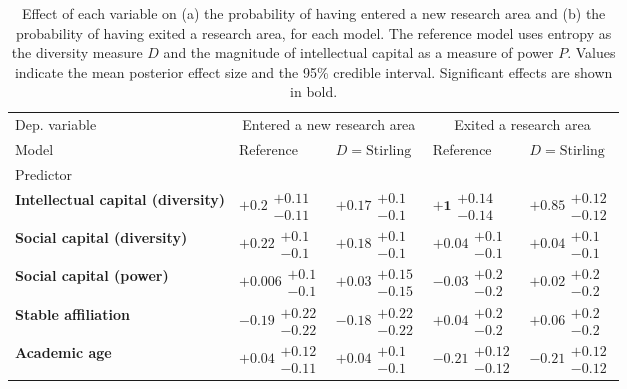 \begin{table}[H]
\caption{Effect of each variable on (a) the probability of having entered a new research area and (b) the probability of having exited a research area, for each model. The reference model uses entropy as the diversity measure $D$ and the magnitude of intellectual capital as a measure of power $P$. Values indicate the mean posterior effect size and the 95\% credible interval. Significant effects are shown in bold.}
\label{table:summary_entered_exited}
\renewcommand{\arraystretch}{2}\fontsize{6}{7}\selectfont\begin{tabular}{lllll}
\toprule
Dep. variable & \multicolumn{2}{c}{Entered a new research area} & \multicolumn{2}{c}{Exited a research area} \\
Model & Reference & $D=\text{Stirling}$ & Reference & $D=\text{Stirling}$ \\
Predictor &  &  &  &  \\
\midrule
\textbf{Intellectual capital (diversity)} & $\bm{+0.2}\substack{+0.11 \\ -0.11}$ & $\bm{+0.17}\substack{+0.1 \\ -0.1}$ & $\bm{+1}\substack{+0.14 \\ -0.14}$ & $\bm{+0.85}\substack{+0.12 \\ -0.12}$ \\
\textbf{Social capital (diversity)} & $\bm{+0.22}\substack{+0.1 \\ -0.1}$ & $\bm{+0.18}\substack{+0.1 \\ -0.1}$ & $+0.04\substack{+0.1 \\ -0.1}$ & $+0.04\substack{+0.1 \\ -0.1}$ \\
\textbf{Social capital (power)} & $+0.006\substack{+0.1 \\ -0.1}$ & $+0.03\substack{+0.15 \\ -0.15}$ & $-0.03\substack{+0.2 \\ -0.2}$ & $+0.02\substack{+0.2 \\ -0.2}$ \\
\textbf{Stable affiliation} & $-0.19\substack{+0.22 \\ -0.22}$ & $-0.18\substack{+0.22 \\ -0.22}$ & $+0.04\substack{+0.2 \\ -0.2}$ & $+0.06\substack{+0.2 \\ -0.2}$ \\
\textbf{Academic age} & $+0.04\substack{+0.12 \\ -0.11}$ & $+0.04\substack{+0.1 \\ -0.1}$ & $\bm{-0.21}\substack{+0.12 \\ -0.12}$ & $\bm{-0.21}\substack{+0.12 \\ -0.12}$ \\

\end{tabular}
\end{table}
